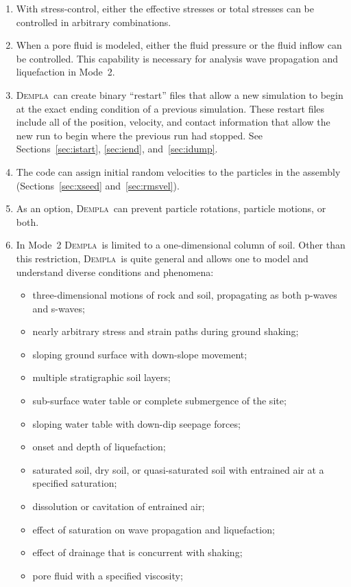 \documentclass[letterpaper,11pt]{article}
\newcommand{\Dempla}{\textsc{Dempla}}
\begin{document}
\begin{enumerate}
\item
With stress-control, either the effective stresses or total stresses
can be controlled in arbitrary combinations.
\item
When a pore fluid is modeled, either the fluid pressure or
the fluid inflow can be controlled.
This capability is necessary for analysis wave propagation
and liquefaction in Mode~2.
\item
\Dempla\ can create binary ``restart'' files that allow a new
simulation to begin at the exact ending condition
of a previous simulation.  These restart files include all of the position, 
velocity, and contact information that allow the new run to begin
where the previous run had stopped.
See Sections~\ref{sec:istart}, \ref{sec:iend}, and~\ref{sec:idump}.
\item
The code can assign initial random velocities to the particles in
the assembly (Sections~\ref{sec:xseed} and~\ref{sec:rmsvel}).
\item
As an option, \Dempla\ can
prevent particle rotations, particle motions, or both.
\item
In Mode~2 \Dempla\ is limited to a one-dimensional column of
soil.
Other than this restriction,
\Dempla\ is quite general and allows one to model and understand
diverse conditions and phenomena:
\begin{itemize}
\item
three-dimensional motions of rock and soil,
propagating as both p-waves and s-waves;
\item
nearly arbitrary stress and strain paths during
ground shaking;
\item
sloping ground surface with down-slope movement;
\item
multiple stratigraphic soil layers;
\item
sub-surface water table or complete submergence of the site;
\item
sloping water table with down-dip seepage forces;
\item
onset and depth of liquefaction;
\item
saturated soil, dry soil, or quasi-saturated soil with entrained air
at a specified saturation;
\item
dissolution or cavitation of entrained air;
\item
effect of saturation on wave propagation and liquefaction;
\item
effect of drainage that is concurrent with shaking;
\item
pore fluid with a specified viscosity;

\end{itemize}
\end{enumerate}
\end{document}
